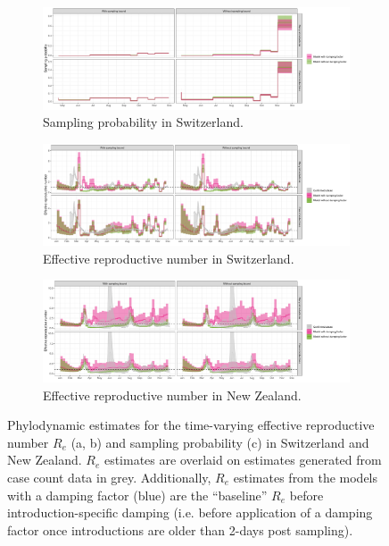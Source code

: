 \documentclass[9pt,twoside,lineno]{pnas-new}
\begin{document}
\begin{figure}[h!]
\centering
\begin{subfigure}[b]{\textwidth}
\includegraphics[width=\linewidth]{figures/CHE_sampProp.pdf}
\caption{Sampling probability in Switzerland.}
\end{subfigure}
\begin{subfigure}[b]{\textwidth}
\includegraphics[width=\linewidth]{figures/CHE_Re.pdf}
\caption{Effective reproductive number in Switzerland.}
\end{subfigure}
\begin{subfigure}[b]{\textwidth}
\includegraphics[width=\linewidth]{figures/NZL_Re.pdf}
\caption{Effective reproductive number in New Zealand.}
\end{subfigure}
\caption{Phylodynamic estimates for the time-varying effective reproductive number $R_e$ (a, b) and sampling probability (c) in Switzerland and New Zealand. $R_e$ estimates are overlaid on estimates generated from case count data \cite{huisman_re_preprint} in grey. Additionally, $R_e$ estimates from the models with a damping factor (blue) are the ``baseline'' $R_e$ before introduction-specific damping (i.e. before application of a damping factor once introductions are older than 2-days post sampling).}  
\label{fig:ReSampProbResults}
\end{figure}
\end{document}
